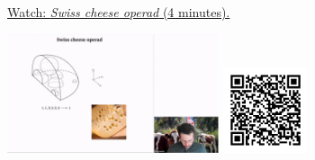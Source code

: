 
\begin{minipage}{10cm}
    \href{https://act4e-spring21.netlify.app/videos/spring2021-operads-a:swiss-cheese-operad.html}{Watch: \emph{Swiss cheese operad} (4 minutes).}
        
    \href{https://act4e-spring21.netlify.app/videos/spring2021-operads-a:swiss-cheese-operad.html}{\includegraphics[height=3.5cm]{spring2021-operads-a:swiss-cheese-operad/thumbnails.jpg}}
    \href{https://act4e-spring21.netlify.app/videos/spring2021-operads-a:swiss-cheese-operad.html}{\includegraphics[height=2.5cm]{spring2021-operads-a:swiss-cheese-operad/qrcode.png}}
\end{minipage}
